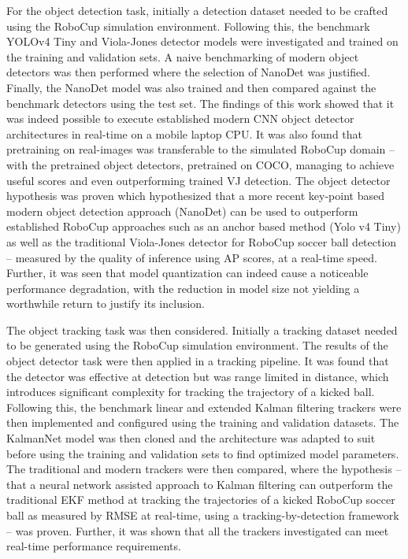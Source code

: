 \documentclass[a4paper,twoside,12pt]{report}
\begin{document}
For the object detection task, initially a detection dataset needed to be crafted using the RoboCup simulation environment. Following this, the benchmark YOLOv4 Tiny and Viola-Jones detector models were investigated and trained on the training and validation sets. A naive benchmarking of modern object detectors was then performed where the selection of NanoDet was justified. Finally, the NanoDet model was also trained and then compared against the benchmark detectors using the test set. The findings of this work showed that it was indeed possible to execute established modern CNN object detector architectures in real-time on a mobile laptop CPU. It was also found that pretraining on real-images was transferable to the simulated RoboCup domain -- with the pretrained object detectors, pretrained on COCO, managing to achieve useful scores and even outperforming trained VJ detection. The object detector hypothesis was proven which hypothesized that a more recent key-point based modern object detection approach (NanoDet) can be used to outperform established RoboCup approaches such as an anchor based method (Yolo v4 Tiny) as well as the traditional Viola-Jones detector for RoboCup soccer ball detection -- measured by the quality of inference using AP scores, at a real-time speed. Further, it was seen that model quantization can indeed cause a noticeable performance degradation, with the reduction in model size not yielding a worthwhile return to justify its inclusion. 

The object tracking task was then considered. Initially a tracking dataset needed to be generated using the RoboCup simulation environment. The results of the object detector task were then applied in a tracking pipeline. It was found that the detector was effective at detection but was range limited in distance, which introduces significant complexity for tracking the trajectory of a kicked ball. Following this, the benchmark linear and extended Kalman filtering trackers were then implemented and configured using the training and validation datasets. The KalmanNet model was then cloned and the architecture was adapted to suit before using the training and validation sets to find optimized model parameters. The traditional and modern trackers were then compared, where the hypothesis -- that a neural network assisted approach to Kalman filtering can outperform the traditional EKF method at tracking the trajectories of a kicked RoboCup soccer ball as measured by RMSE at real-time, using a tracking-by-detection framework -- was proven. Further, it was shown that all the trackers investigated can meet real-time performance requirements.
\end{document}
